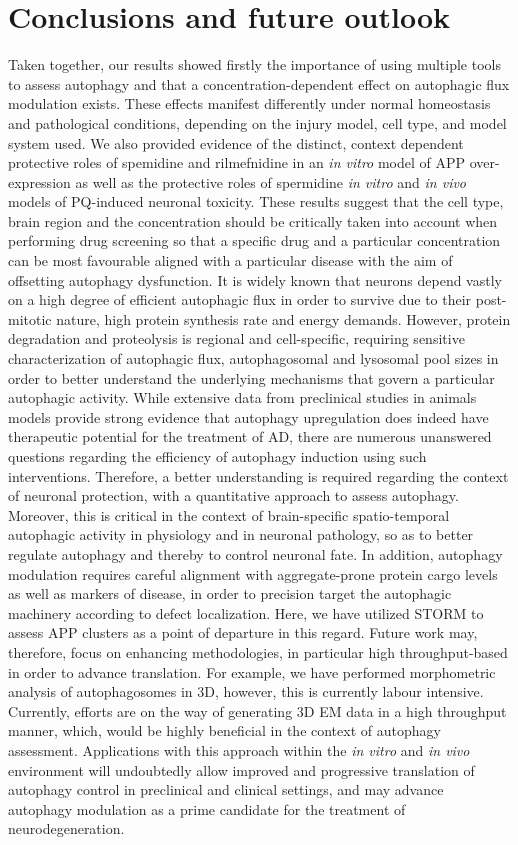 \section{Conclusions and future outlook}
Taken together, our results showed firstly the importance of using multiple tools to assess autophagy and that a concentration-dependent effect on autophagic flux modulation exists. These effects manifest differently under normal homeostasis and pathological conditions, depending on the injury model, cell type, and model system used. We also provided evidence of the distinct, context dependent protective roles of spemidine and rilmefnidine in an \textit{in vitro} model of APP over-expression as well as the protective roles of spermidine \textit{in vitro} and \textit{in vivo} models of PQ-induced neuronal toxicity. These results suggest that the cell type, brain region and the concentration should be critically taken into account when performing drug screening so that a specific drug and a particular concentration can be most favourable aligned with a particular disease with the aim of offsetting autophagy dysfunction. It is widely known that neurons depend vastly on a high degree of efficient autophagic flux in order to survive due to their post-mitotic nature, high protein synthesis rate and energy demands. However, protein degradation and proteolysis is regional and cell-specific, requiring sensitive characterization of autophagic flux, autophagosomal and lysosomal pool sizes in order to better understand the underlying mechanisms that govern a particular autophagic activity. While extensive data from preclinical studies in animals models provide strong evidence that autophagy upregulation does indeed have therapeutic potential for the treatment of AD, there are numerous unanswered questions regarding the efficiency of autophagy induction using such interventions. Therefore, a better understanding is required regarding the context of neuronal protection, with a quantitative approach to assess autophagy. Moreover, this is critical in the context of brain-specific spatio-temporal autophagic activity in physiology and in neuronal pathology, so as to better regulate autophagy and thereby to control neuronal fate. In addition, autophagy modulation requires careful alignment with aggregate-prone protein cargo levels as well as markers of disease, in order to precision target the autophagic machinery according to defect localization. Here, we have utilized STORM to assess APP clusters as a point of departure in this regard. Future work may, therefore, focus on enhancing methodologies, in particular high throughput-based in order to advance translation. For example, we have performed morphometric analysis of autophagosomes in 3D, however, this is currently labour intensive. Currently, efforts are on the way of generating 3D EM data in a high throughput manner, which, would be highly beneficial in the context of autophagy assessment. Applications with this approach within the \textit{in vitro} and \textit{in vivo} environment will undoubtedly allow improved and progressive translation of autophagy control in preclinical and clinical settings, and may advance autophagy modulation as a prime candidate for the treatment of neurodegeneration. 